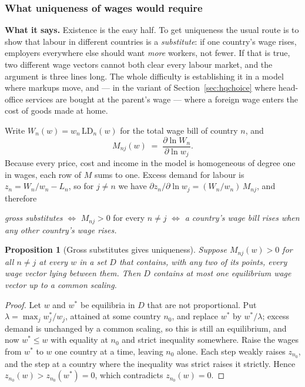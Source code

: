 \documentclass[11pt]{article}
\newcommand{\says}[1]{\smallskip\noindent\textbf{What it says.} #1\smallskip}
\theoremstyle{plain}
\newtheorem{proposition}{Proposition}
\theoremstyle{remark}
\theoremstyle{definition}
\begin{document}
\subsubsection{What uniqueness of wages would require}
\label{sec:wageunique}

\says{Existence is the easy half. To get uniqueness the usual route is to show that
labour in different countries is a \emph{substitute}: if one country's wage rises,
employers everywhere else should want \emph{more} workers, not fewer. If that is true,
two different wage vectors cannot both clear every labour market, and the argument is
three lines long. The whole difficulty is establishing it in a model where markups
move, and --- in the variant of Section~\ref{sec:hqchoice} where head-office services are
bought at the parent's wage --- where a foreign wage enters the cost of goods made at home.}

Write $W_n(w)=w_n\,\mathrm{LD}_n(w)$ for the total wage bill of country $n$, and
\[
  M_{nj}(w)\;=\;\frac{\partial \ln W_n}{\partial \ln w_j}.
\]
Because every price, cost and income in the model is homogeneous of degree one in
wages, each row of $M$ sums to one. Excess demand for labour is
$z_n=W_n/w_n-L_n$, so for $j\neq n$ we have
$\partial z_n/\partial\ln w_j=(W_n/w_n)\,M_{nj}$, and therefore
\begin{center}
\emph{gross substitutes} $\iff$ $M_{nj}>0$ for every $n\neq j$ $\iff$
\emph{a country's wage bill rises when any other country's wage rises.}
\end{center}

\begin{proposition}[Gross substitutes gives uniqueness]\label{prop:abh}
Suppose $M_{nj}(w)>0$ for all $n\neq j$ at every $w$ in a set $D$ that contains, with
any two of its points, every wage vector lying between them. Then $D$ contains at most
one equilibrium wage vector up to a common scaling.
\end{proposition}

\begin{proof}
Let $w$ and $w^{*}$ be equilibria in $D$ that are not proportional. Put
$\lambda=\max_j w^{*}_j/w_j$, attained at some country $n_0$, and replace $w^{*}$ by
$w^{*}/\lambda$; excess demand is unchanged by a common scaling, so this is still an
equilibrium, and now $w^{*}\le w$ with equality at $n_0$ and strict inequality
somewhere. Raise the wages from $w^{*}$ to $w$ one country at a time, leaving $n_0$
alone. Each step weakly raises $z_{n_0}$, and the step at a country where the
inequality was strict raises it strictly. Hence $z_{n_0}(w)>z_{n_0}(w^{*})=0$, which
contradicts $z_{n_0}(w)=0$.
\end{proof}
\end{document}
